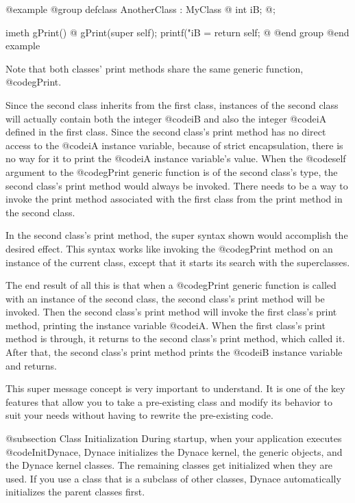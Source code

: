 @example
@group
defclass  AnotherClass : MyClass  @{
        int     iB;
@};

imeth   gPrint()
@{
        gPrint(super self);
        printf("iB = %
        return self;
@}
@end group
@end example

Note that both classes' print methods share the same generic function,
@code{gPrint}.

Since the second class inherits from the first class, instances of the
second class will actually contain both the integer @code{iB} and also
the integer @code{iA} defined in the first class.  Since the second
class's print method has no direct access to the @code{iA} instance
variable, because of strict encapsulation, there is no way for it to
print the @code{iA} instance variable's value.  When the @code{self}
argument to the @code{gPrint} generic function is of the second class's
type, the second class's print method would always be invoked.  There needs
to be a way to invoke the print method associated with the first class from
the print method in the second class.

In the second class's print method, the super syntax shown would
accomplish the desired effect.  This syntax works like invoking the
@code{gPrint} method on an instance of the current class, except that it
starts its search with the superclasses.

The end result of all this is that when a @code{gPrint} generic function is
called with an instance of the second class, the second class's print method
will be invoked.  Then the second class's print method will invoke the first
class's print method, printing the instance variable @code{iA}.  When the
first class's print method is through, it returns to the second class's
print method, which called it.  After that, the second class's print
method prints the @code{iB} instance variable and returns.

This super message concept is very important to understand.  It is one
of the key features that allow you to take a pre-existing class and
modify its behavior to suit your needs without having to rewrite the
pre-existing code.

@subsection Class Initialization
During startup, when your application executes @code{InitDynace},
Dynace initializes the Dynace kernel, the generic objects, and
the Dynace kernel classes.  The remaining classes get initialized
when they are used.  If you use a class that is a subclass of
other classes, Dynace automatically initializes the parent classes
first.

